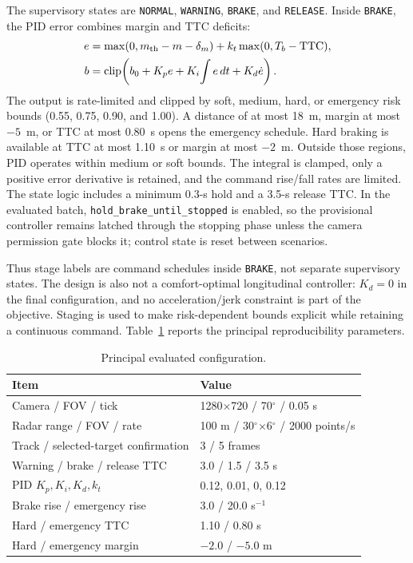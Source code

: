 \documentclass[conference]{IEEEtran}
\begin{document}
The supervisory states are \texttt{NORMAL}, \texttt{WARNING}, \texttt{BRAKE},
and \texttt{RELEASE}. Inside \texttt{BRAKE}, the PID error combines margin and
TTC deficits:
\begin{equation}
\begin{aligned}
 e&=\max(0,m_{\rm th}-m-\delta_m)
   +k_t\max(0,T_b-\mathrm{TTC}),\\
 b&=\operatorname{clip}\!\left(b_0+K_pe+K_i\!\int e\,dt+K_d\dot e\right).
\end{aligned}
\label{eq:pid}
\end{equation}
The output is rate-limited and clipped by soft, medium, hard, or emergency risk
bounds (0.55, 0.75, 0.90, and 1.00). A distance of at most 18~m, margin at most
$-5$~m, or TTC at most 0.80~s opens the emergency schedule. Hard braking is
available at TTC at most 1.10~s or margin at most $-2$~m. Outside those regions,
PID operates within medium or soft bounds. The integral is clamped, only a
positive error derivative is retained, and the command rise/fall rates are
limited. The state logic includes a minimum 0.3-s hold and a 3.5-s release TTC.
In the evaluated batch, \texttt{hold\_brake\_until\_stopped} is enabled, so the
provisional controller remains latched through the stopping phase unless the
camera permission gate blocks it; control state is reset between scenarios.

Thus stage labels are command schedules inside \texttt{BRAKE}, not separate
supervisory states. The design is also not a comfort-optimal longitudinal
controller: $K_d=0$ in the final configuration, and no acceleration/jerk
constraint is part of the objective. Staging is used to make risk-dependent
bounds explicit while retaining a continuous command. Table~\ref{tab:config}
reports the principal reproducibility parameters.

\begin{table}[t]
\caption{Principal evaluated configuration.}
\label{tab:config}
\centering
\footnotesize
\begin{tabular}{p{}p{}}
\toprule
Item & Value \\
\midrule
Camera / FOV / tick & 1280$\times$720 / 70$^\circ$ / 0.05 s \\
Radar range / FOV / rate & 100 m / 30$^\circ$$\times$6$^\circ$ / 2000 points/s \\
Track / selected-target confirmation & 3 / 5 frames \\
Warning / brake / release TTC & 3.0 / 1.5 / 3.5 s \\
PID $K_p,K_i,K_d,k_t$ & 0.12, 0.01, 0, 0.12 \\
Brake rise / emergency rise & 3.0 / 20.0 s$^{-1}$ \\
Hard / emergency TTC & 1.10 / 0.80 s \\
Hard / emergency margin & $-2.0$ / $-5.0$ m \\
\bottomrule
\end{tabular}
\end{table}
\end{document}
